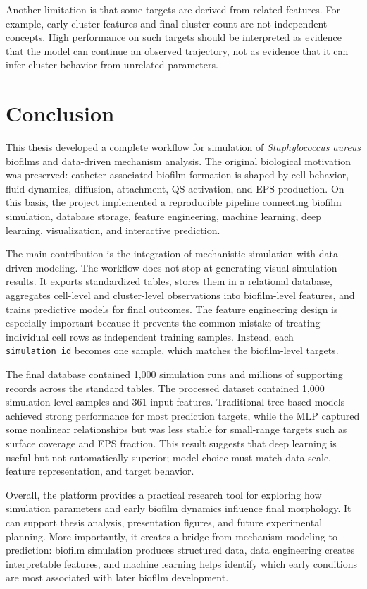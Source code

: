 \documentclass[12pt,a4paper,oneside]{report}
\begin{document}
Another limitation is that some targets are derived from related features. For example, early cluster features and final cluster count are not independent concepts. High performance on such targets should be interpreted as evidence that the model can continue an observed trajectory, not as evidence that it can infer cluster behavior from unrelated parameters.

\chapter{Conclusion}
This thesis developed a complete workflow for simulation of \textit{Staphylococcus aureus} biofilms and data-driven mechanism analysis. The original biological motivation was preserved: catheter-associated biofilm formation is shaped by cell behavior, fluid dynamics, diffusion, attachment, QS activation, and EPS production. On this basis, the project implemented a reproducible pipeline connecting biofilm simulation, database storage, feature engineering, machine learning, deep learning, visualization, and interactive prediction.

The main contribution is the integration of mechanistic simulation with data-driven modeling. The workflow does not stop at generating visual simulation results. It exports standardized tables, stores them in a relational database, aggregates cell-level and cluster-level observations into biofilm-level features, and trains predictive models for final outcomes. The feature engineering design is especially important because it prevents the common mistake of treating individual cell rows as independent training samples. Instead, each \texttt{simulation\_id} becomes one sample, which matches the biofilm-level targets.

The final database contained 1,000 simulation runs and millions of supporting records across the standard tables. The processed dataset contained 1,000 simulation-level samples and 361 input features. Traditional tree-based models achieved strong performance for most prediction targets, while the MLP captured some nonlinear relationships but was less stable for small-range targets such as surface coverage and EPS fraction. This result suggests that deep learning is useful but not automatically superior; model choice must match data scale, feature representation, and target behavior.

Overall, the platform provides a practical research tool for exploring how simulation parameters and early biofilm dynamics influence final morphology. It can support thesis analysis, presentation figures, and future experimental planning. More importantly, it creates a bridge from mechanism modeling to prediction: biofilm simulation produces structured data, data engineering creates interpretable features, and machine learning helps identify which early conditions are most associated with later biofilm development.
\end{document}
